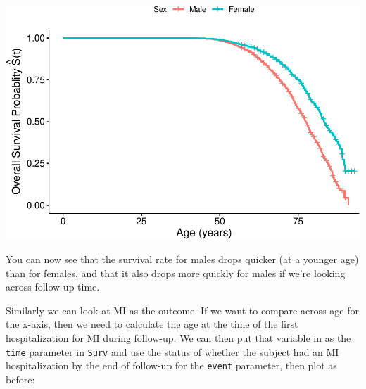 \documentclass[
]{book}
\newenvironment{Shaded}{\begin{snugshade}}{\end{snugshade}}
\newcommand{\DataTypeTok}[1]{\textcolor[rgb]{0.13,0.29,0.53}{#1}}
\newcommand{\KeywordTok}[1]{\textcolor[rgb]{0.13,0.29,0.53}{\textbf{#1}}}
\newcommand{\NormalTok}[1]{#1}
\newcommand{\OperatorTok}[1]{\textcolor[rgb]{0.81,0.36,0.00}{\textbf{#1}}}
\newcommand{\StringTok}[1]{\textcolor[rgb]{0.31,0.60,0.02}{#1}}
\begin{document}
\begin{Shaded}
\end{Shaded}

\includegraphics{adv_epi_analysis_files/figure-latex/unnamed-chunk-203-2.pdf}

You can now see that the survival rate for males drops quicker (at a younger age) than for females, and that it also drops more quickly for males if we're looking across follow-up time.

Similarly we can look at MI as the outcome. If we want to compare across age for the x-axis, then we need to calculate the age at the time of the first hospitalization for MI during follow-up. We can then put that variable in as the \texttt{time} parameter in \texttt{Surv} and use the status of whether the subject had an MI hospitalization by the end of follow-up for the \texttt{event} parameter, then plot as before:
\end{document}
